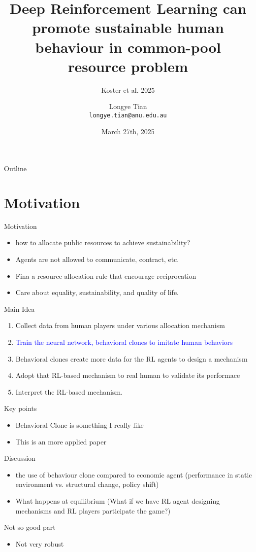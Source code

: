\documentclass[aspectratio=169]{beamer} %
\title[DRL]{Deep Reinforcement Learning can promote sustainable human behaviour in common-pool resource problem}
\subtitle{Koster et al. 2025}
\author[Longye]{Longye Tian \\ \texttt{longye.tian@anu.edu.au}}
\institute[ANU]{Australian National University\\ School of Economics}
\date{March 27th, 2025}
\begin{document}
\begin{frame}
  \titlepage
\end{frame}

\begin{frame}{Outline}
  \tableofcontents
\end{frame}
\section{Motivation}
\begin{frame}{Motivation}
\begin{itemize}
    \item how to allocate public resources to achieve sustainability?
    \item Agents are not allowed to communicate, contract, etc.
    \item Fina a resource allocation rule that encourage reciprocation
    \item Care about equality, sustainability, and quality of life.
\end{itemize}
\end{frame}

\begin{frame}{Main Idea}
\begin{enumerate}
    \item Collect data from human players under various allocation mechanism
    \item \textcolor{blue}{Train the neural network, behavioral clones to imitate human behaviors}
    \item Behavioral clones create more data for the RL agents to design a mechanism 
    \item Adopt that RL-based mechanism to real human to validate its performace
    \item Interpret the RL-based mechanism.
\end{enumerate}
\end{frame}

\begin{frame}{Key points}
\begin{itemize}
    \item Behavioral Clone is something I really like
    \item This is an more applied paper 
\end{itemize}
    
\end{frame}



\begin{frame}{Discussion}
\begin{itemize}
    \item the use of behaviour clone compared to economic agent (performance in static environment vs. structural change, policy shift)
    \item What happens at equilibrium (What if we have RL agent designing mechanisms and RL players participate the game?)
\end{itemize}
    
\end{frame}


\begin{frame}{Not so good part}
\begin{itemize}
    \item Not very robust 
\end{itemize}
    
\end{frame}
\end{document}
